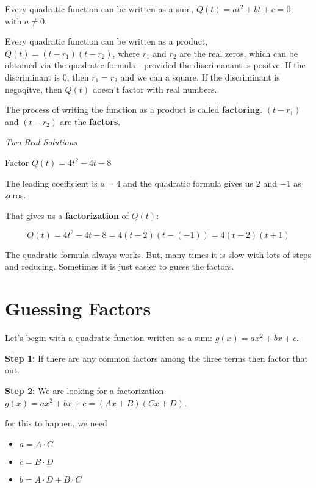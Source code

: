 \documentclass{ximera}
\begin{document}
Every quadratic function can be written as a sum, $Q(t) = a t^2 + b t + c = 0$, with $a \ne 0$.

Every quadratic function can be written as a product, $Q(t) = (t - r_1)(t - r_2)$, where $r_1$ and $r_2$ are the real zeros, which can be obtained via the quadratic formula - provided the discrimanant is positve.  If the discriminant is $0$, then $r_1 = r_2$ and we can a square.  If the discriminant is negaqitve, then $Q(t)$ doesn't factor with real numbers.  


The process of writing the function as a product is called \textbf{factoring}. $(t - r_1)$  and $(t - r_2)$ are the \textbf{factors}.



\begin{example} \textit{Two Real Solutions} 

Factor $Q(t) = 4 t^2 - 4 t - 8$ 

The leading coefficient is $a=4$ and the quadratic formula gives us $2$ and $-1$ as zeros.  

That gives us a \textbf{factorization} of $Q(t)$:



\[    Q(t) = 4 t^2 - 4 t - 8 =  4 (t-2)(t-(-1))    = 4 (t-2)(t+1)         \]



\end{example}



The quadratic formula always works.  But, many times it is slow with lots of steps and reducing.  Sometimes it is just easier to guess the factors.



\section{Guessing Factors}


Let's begin with a quadratic function written as a sum: $g(x) = a x^2 + b x + c$.  


\textbf{Step 1:} If there are any common factors among the three terms then factor that out.


\textbf{Step 2:} We are looking for a factorization $g(x) = a x^2 + b x + c = (A x + B)(C x + D)$.

for this to happen, we need

\begin{itemize}
\item $a = A \cdot C $
\item $c = B \cdot D$
\item $b = A\cdot D + B \cdot C$
\end{itemize}
\end{document}
